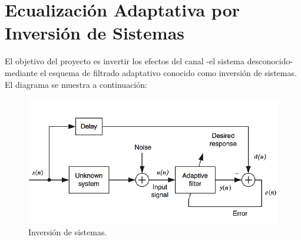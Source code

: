 \documentclass[main.tex]{subfiles}
\begin{document}
\section{Ecualización Adaptativa por Inversión de Sistemas}

El objetivo del proyecto es invertir los efectos del canal 
-el sistema desconocido- mediante el esquema de filtrado
adaptativo conocido como inversión de sistemas. El diagrama se muestra 
a continuación:

\begin{figure}[H]
    \label{inversion-de-sistemas}
    \centering
    \includegraphics[scale=0.5]{imagenes/block.PNG}
    \caption{Inversión de sistemas.}
\end{figure}
\end{document}
